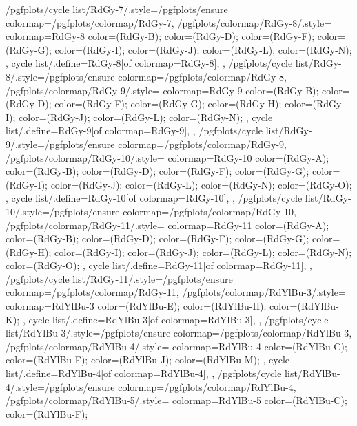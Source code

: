 {  /pgfplots/cycle list/RdGy-7/.style={/pgfplots/ensure colormap={/pgfplots/colormap/RdGy-7}},
  /pgfplots/colormap/RdGy-8/.style={
    colormap={RdGy-8}{
      color=(RdGy-B);
      color=(RdGy-D);
      color=(RdGy-F);
      color=(RdGy-G);
      color=(RdGy-I);
      color=(RdGy-J);
      color=(RdGy-L);
      color=(RdGy-N);
    },
    cycle list/.define={RdGy-8}{[of colormap=RdGy-8]},
  },
  /pgfplots/cycle list/RdGy-8/.style={/pgfplots/ensure colormap={/pgfplots/colormap/RdGy-8}},
  /pgfplots/colormap/RdGy-9/.style={
    colormap={RdGy-9}{
      color=(RdGy-B);
      color=(RdGy-D);
      color=(RdGy-F);
      color=(RdGy-G);
      color=(RdGy-H);
      color=(RdGy-I);
      color=(RdGy-J);
      color=(RdGy-L);
      color=(RdGy-N);
    },
    cycle list/.define={RdGy-9}{[of colormap=RdGy-9]},
  },
  /pgfplots/cycle list/RdGy-9/.style={/pgfplots/ensure colormap={/pgfplots/colormap/RdGy-9}},
  /pgfplots/colormap/RdGy-10/.style={
    colormap={RdGy-10}{
      color=(RdGy-A);
      color=(RdGy-B);
      color=(RdGy-D);
      color=(RdGy-F);
      color=(RdGy-G);
      color=(RdGy-I);
      color=(RdGy-J);
      color=(RdGy-L);
      color=(RdGy-N);
      color=(RdGy-O);
    },
    cycle list/.define={RdGy-10}{[of colormap=RdGy-10]},
  },
  /pgfplots/cycle list/RdGy-10/.style={/pgfplots/ensure colormap={/pgfplots/colormap/RdGy-10}},
  /pgfplots/colormap/RdGy-11/.style={
    colormap={RdGy-11}{
      color=(RdGy-A);
      color=(RdGy-B);
      color=(RdGy-D);
      color=(RdGy-F);
      color=(RdGy-G);
      color=(RdGy-H);
      color=(RdGy-I);
      color=(RdGy-J);
      color=(RdGy-L);
      color=(RdGy-N);
      color=(RdGy-O);
    },
    cycle list/.define={RdGy-11}{[of colormap=RdGy-11]},
  },
  /pgfplots/cycle list/RdGy-11/.style={/pgfplots/ensure colormap={/pgfplots/colormap/RdGy-11}},
  /pgfplots/colormap/RdYlBu-3/.style={
    colormap={RdYlBu-3}{
      color=(RdYlBu-E);
      color=(RdYlBu-H);
      color=(RdYlBu-K);
    },
    cycle list/.define={RdYlBu-3}{[of colormap=RdYlBu-3]},
  },
  /pgfplots/cycle list/RdYlBu-3/.style={/pgfplots/ensure colormap={/pgfplots/colormap/RdYlBu-3}},
  /pgfplots/colormap/RdYlBu-4/.style={
    colormap={RdYlBu-4}{
      color=(RdYlBu-C);
      color=(RdYlBu-F);
      color=(RdYlBu-J);
      color=(RdYlBu-M);
    },
    cycle list/.define={RdYlBu-4}{[of colormap=RdYlBu-4]},
  },
  /pgfplots/cycle list/RdYlBu-4/.style={/pgfplots/ensure colormap={/pgfplots/colormap/RdYlBu-4}},
  /pgfplots/colormap/RdYlBu-5/.style={
    colormap={RdYlBu-5}{
      color=(RdYlBu-C);
      color=(RdYlBu-F);
}}}
